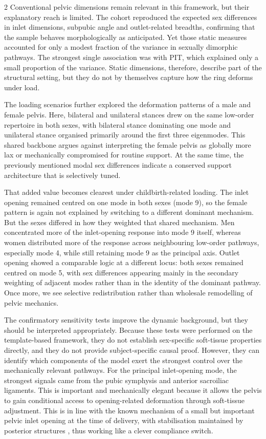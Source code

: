 \documentclass[openacc]{rsproca_new}
\begin{document}
\begin{multicols}{2}
Conventional pelvic dimensions remain relevant in this framework, but their explanatory reach is limited. The cohort reproduced the expected sex differences in inlet dimensions, subpubic angle and outlet-related breadths, confirming that the sample behaves morphologically as anticipated. Yet those static measures accounted for only a modest fraction of the variance in sexually dimorphic pathways. The strongest single association was with PIT, which explained only a small proportion of the variance. Static dimensions, therefore, describe part of the structural setting, but they do not by themselves capture how the ring deforms under load.

The loading scenarios further explored the deformation patterns of a male and female pelvis. Here, bilateral and unilateral stances drew on the same low-order repertoire in both sexes, with bilateral stance dominating one mode and unilateral stance organised primarily around the first three eigenmodes. This shared backbone argues against interpreting the female pelvis as globally more lax or mechanically compromised for routine support. At the same time, the previously mentioned modal sex differences indicate a conserved support architecture that is selectively tuned.

That added value becomes clearest under childbirth-related loading. The inlet opening remained centred on one mode in both sexes (mode 9), so the female pattern is again not explained by switching to a different dominant mechanism. But the sexes differed in how they weighted that shared mechanism. Men concentrated more of the inlet-opening response into mode 9 itself, whereas women distributed more of the response across neighbouring low-order pathways, especially mode 4, while still retaining mode 9 as the principal axis. Outlet opening showed a comparable logic at a different locus: both sexes remained centred on mode 5, with sex differences appearing mainly in the secondary weighting of adjacent modes rather than in the identity of the dominant pathway. Once more, we see selective redistribution rather than wholesale remodelling of pelvic mechanics.

The confirmatory sensitivity tests improve the dynamic background, but they should be interpreted appropriately. Because these tests were performed on the template-based framework, they do not establish sex-specific soft-tissue properties directly, and they do not provide subject-specific causal proof. However, they can identify which components of the model exert the strongest control over the mechanically relevant pathways. For the principal inlet-opening mode, the strongest signals came from the pubic symphysis and anterior sacroiliac ligaments. This is important and mechanically elegant because it allows the pelvis to gain conditional access to opening-related deformation through soft-tissue adjustment. This is in line with the known mechanism of a small but important pelvic inlet opening at the time of delivery, with stabilisation maintained by posterior structures \cite{Hammer2013}, thus working like a clever compliance switch.


\end{multicols}
\end{document}
